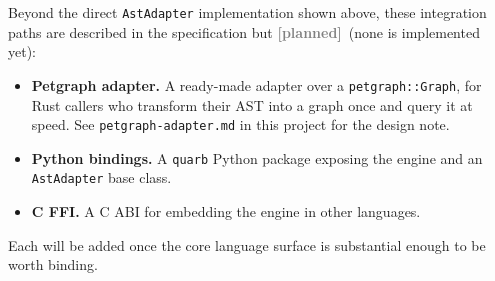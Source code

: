\documentclass{report}
\newcommand{\planned}{\textbf{\textcolor{gray}{[planned]}}\xspace}
\begin{document}
Beyond the direct \texttt{AstAdapter} implementation shown above,
these integration paths are described in the specification but
\planned\ (none is implemented yet):

\begin{itemize}
\item \textbf{Petgraph adapter.} A ready-made adapter over a
  \texttt{petgraph::Graph}, for Rust callers who transform their AST
  into a graph once and query it at speed. See
  \texttt{petgraph-adapter.md} in this project for the design note.
\item \textbf{Python bindings.} A \texttt{quarb} Python package
  exposing the engine and an \texttt{AstAdapter} base class.
\item \textbf{C FFI.} A C ABI for embedding the engine in other
  languages.
\end{itemize}

\noindent
Each will be added once the core language surface is substantial
enough to be worth binding.
\end{document}
